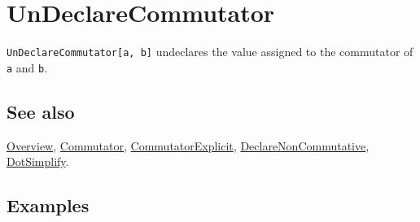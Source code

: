 \documentclass[../FeynCalcManual.tex]{subfiles}
\begin{document}
\hypertarget{undeclarecommutator}{
\section{UnDeclareCommutator}\label{undeclarecommutator}}

\texttt{UnDeclareCommutator[\allowbreak{}a,\ \allowbreak{}b]} undeclares
the value assigned to the commutator of \texttt{a} and \texttt{b}.

\subsection{See also}

\hyperlink{toc}{Overview}, \hyperlink{commutator}{Commutator},
\hyperlink{commutatorexplicit}{CommutatorExplicit},
\hyperlink{declarenoncommutative}{DeclareNonCommutative},
\hyperlink{dotsimplify}{DotSimplify}.

\subsection{Examples}

\begin{Shaded}
\begin{Highlighting}[]
\OperatorTok{[}\OperatorTok{[}\OperatorTok{[}\OperatorTok{[}\OperatorTok{]],} \OperatorTok{],}\OperatorTok{[}\OperatorTok{]]} \ExtensionTok{=} \NormalTok{;}
\end{Highlighting}
\end{Shaded}

\begin{Shaded}
\begin{Highlighting}[]
\OperatorTok{[}\OperatorTok{]}\OperatorTok{[}\OperatorTok{]}\OperatorTok{[}\SpecialCharTok{\textbackslash{}}\OperatorTok{[}\OperatorTok{]]}\OperatorTok{[}\OperatorTok{]}\OperatorTok{[}\OperatorTok{]}\OperatorTok{[}\SpecialCharTok{\textbackslash{}}\OperatorTok{[}\OperatorTok{]]} 
 
\OperatorTok{[}\SpecialCharTok{\%}\OperatorTok{]}
\end{Highlighting}
\end{Shaded}
\end{document}
